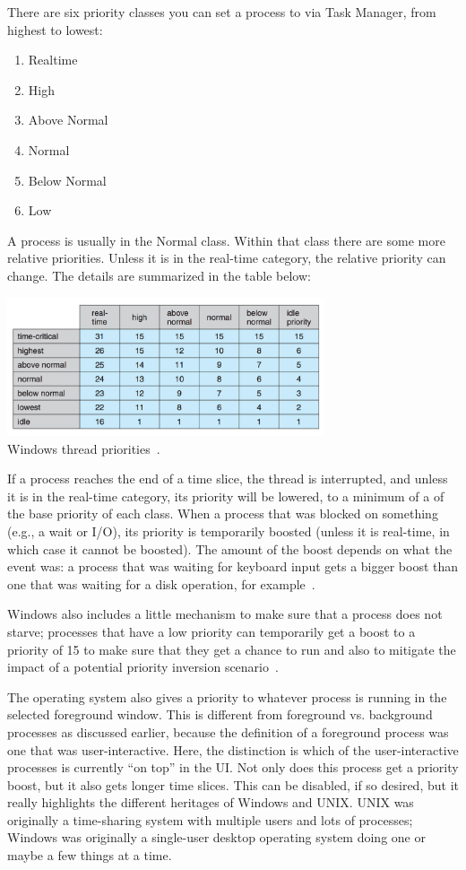 There are six priority classes you can set a process to via Task Manager, from highest to lowest:
\begin{enumerate}
	\item Realtime
	\item High
	\item Above Normal
	\item Normal
	\item Below Normal
	\item Low
\end{enumerate}

A process is usually in the Normal class. Within that class there are some more relative priorities. Unless it is in the real-time category, the relative priority can change. The details are summarized in the table below:

\begin{center}
	\includegraphics[width=0.7\textwidth]{images/windows-thread-priorities.png}\\
	Windows thread priorities~\cite{osc}.
\end{center}

If a process reaches the end of a time slice, the thread is interrupted, and unless it is in the real-time category, its priority will be lowered, to a minimum of a of the base priority of each class. When a process that was blocked on something (e.g., a wait or I/O), its priority is temporarily boosted (unless it is real-time, in which case it cannot be boosted). The amount of the boost depends on what the event was: a process that was waiting for keyboard input gets a bigger boost than one that was waiting for a disk operation, for example~\cite{osc}. 

Windows also includes a little mechanism to make sure that a process does not starve; processes that have a low priority can temporarily get a boost to a priority of 15 to make sure that they get a chance to run and also to mitigate the impact of a potential priority inversion scenario~\cite{osi}.

The operating system also gives a priority to whatever process is running in the selected foreground window. This is different from foreground vs. background processes as discussed earlier, because the definition of a foreground process was one that was user-interactive. Here, the distinction is which of the user-interactive processes is currently ``on top'' in the UI. Not only does this process get a priority boost, but it also gets longer time slices. This can be disabled, if so desired, but it really highlights the different heritages of Windows and UNIX. UNIX was originally a time-sharing system with multiple users and lots of processes; Windows was originally a single-user desktop operating system doing one or maybe a few things at a time.




